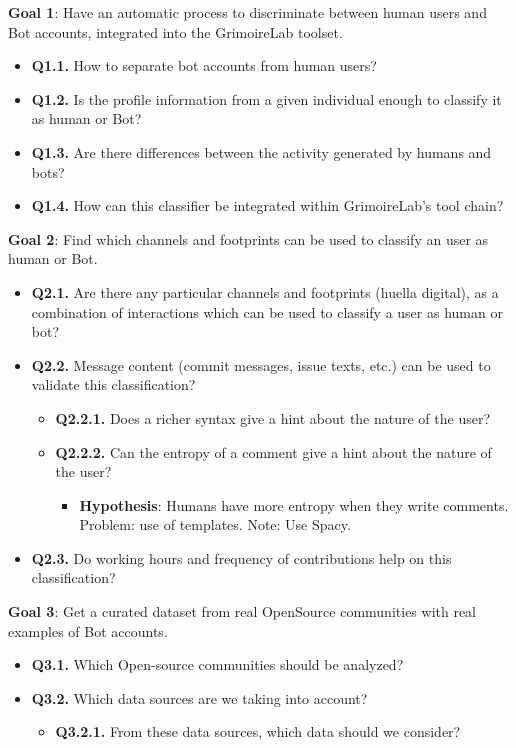 \documentclass[a4paper, 12pt]{book}
\begin{document}
\textbf{Goal 1}: Have an automatic process to discriminate between human users and Bot accounts, integrated into the GrimoireLab toolset.

\begin{itemize}
    \item \textbf{Q1.1.} How to separate bot accounts from human users?
    \item \textbf{Q1.2.} Is the profile information from a given individual enough to classify it as human or Bot?
    \item \textbf{Q1.3.} Are there differences between the activity generated by humans and bots?
    \item \textbf{Q1.4.} How can this classifier be integrated within GrimoireLab’s tool chain?
\end{itemize}

\textbf{Goal 2}: Find which channels and footprints can be used to classify an user as human or Bot.

\begin{itemize}
    \item \textbf{Q2.1.} Are there any particular channels and footprints (huella digital), as a combination of interactions which can be used to classify a user as human or bot?
    \item \textbf{Q2.2.} Message content (commit messages, issue texts, etc.) can be used to validate this classification?
    \begin{itemize}
        \item \textbf{Q2.2.1.} Does a richer syntax give a hint about the nature of the user? 
        \item \textbf{Q2.2.2.} Can the entropy of a comment give a hint about the nature of the user? \begin{itemize}
            \item \textbf{Hypothesis}: Humans have more entropy when they write comments. Problem: use of templates. Note: Use Spacy.
        \end{itemize}
    \end{itemize}
    \item \textbf{Q2.3.} Do working hours and frequency of contributions help on this classification?

\end{itemize}

\textbf{Goal 3}: Get a curated dataset from real OpenSource communities with real examples of Bot accounts.

\begin{itemize}
    \item \textbf{Q3.1.} Which Open-source communities should be analyzed?
    \item \textbf{Q3.2.} Which data sources are we taking into account?
    \begin{itemize}
        \item \textbf{Q3.2.1.} From these data sources, which data should we consider?
    \end{itemize}
\end{itemize}
\end{document}
